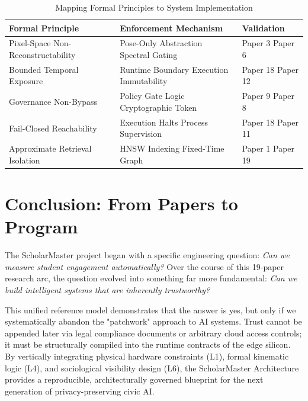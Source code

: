 \documentclass[conference]{IEEEtran}
\begin{document}
\begin{table}[htbp]
\caption{Mapping Formal Principles to System Implementation}
\begin{center}
\begin{tabular}{p{2.5cm} p{3.0cm} p{2.0cm}}
\toprule
\textbf{Formal Principle} & \textbf{Enforcement Mechanism} & \textbf{Validation} \\
\midrule
Pixel-Space Non-Reconstructability & Pose-Only Abstraction \newline Spectral Gating & Paper 3 \newline Paper 6 \\
\midrule
Bounded Temporal Exposure & Runtime Boundary \newline Execution Immutability & Paper 18 \newline Paper 12 \\
\midrule
Governance Non-Bypass & Policy Gate Logic \newline Cryptographic Token & Paper 9 \newline Paper 8 \\
\midrule
Fail-Closed Reachability & Execution Halts \newline Process Supervision & Paper 18 \newline Paper 11 \\
\midrule
Approximate Retrieval Isolation & HNSW Indexing \newline Fixed-Time Graph & Paper 1 \newline Paper 19 \\
\bottomrule
\end{tabular}
\end{center}
\end{table}

\section{Conclusion: From Papers to Program}
The ScholarMaster project began with a specific engineering question: \textit{Can we measure student engagement automatically?} Over the course of this 19-paper research arc, the question evolved into something far more fundamental: \textit{Can we build intelligent systems that are inherently trustworthy?}

This unified reference model demonstrates that the answer is yes, but only if we systematically abandon the "patchwork" approach to AI systems. Trust cannot be appended later via legal compliance documents or arbitrary cloud access controls; it must be structurally compiled into the runtime contracts of the edge silicon. By vertically integrating physical hardware constraints (L1), formal kinematic logic (L4), and sociological visibility design (L6), the ScholarMaster Architecture provides a reproducible, architecturally governed blueprint for the next generation of privacy-preserving civic AI.
\end{document}

